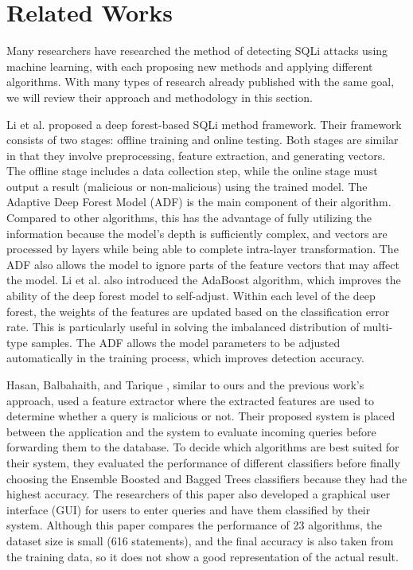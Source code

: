 \section{Related Works}
\label{sec:related-works}


\par Many researchers have researched the method of detecting SQLi attacks using machine learning, with each proposing new methods and applying different algorithms. With many types of research already published with the same goal, we will review their approach and methodology in this section.
\par Li et al. \cite{8854182} proposed a deep forest-based SQLi method framework. Their framework consists of two stages: offline training and online testing. Both stages are similar in that they involve preprocessing, feature extraction, and generating vectors. The offline stage includes a data collection step, while the online stage must output a result (malicious or non-malicious) using the trained model. The Adaptive Deep Forest Model (ADF) is the main component of their algorithm. Compared to other algorithms, this has the advantage of fully utilizing the information because the model's depth is sufficiently complex, and vectors are processed by layers while being able to complete intra-layer transformation. The ADF also allows the model to ignore parts of the feature vectors that may affect the model. Li et al. also introduced the AdaBoost algorithm, which improves the ability of the deep forest model to self-adjust. Within each level of the deep forest, the weights of the features are updated based on the classification error rate. This is particularly useful in solving the imbalanced distribution of multi-type samples. The ADF allows the model parameters to be adjusted automatically in the training process, which improves detection accuracy.
\par Hasan, Balbahaith, and Tarique \cite{8959617}, similar to ours and the previous work's approach, used a feature extractor where the extracted features are used to determine whether a query is malicious or not. Their proposed system is placed between the application and the system to evaluate incoming queries before forwarding them to the database. To decide which algorithms are best suited for their system, they evaluated the performance of different classifiers before finally choosing the Ensemble Boosted and Bagged Trees classifiers because they had the highest accuracy. The researchers of this paper also developed a graphical user interface (GUI) for users to enter queries and have them classified by their system. Although this paper compares the performance of 23 algorithms, the dataset size is small (616 statements), and the final accuracy is also taken from the training data, so it does not show a good representation of the actual result.
